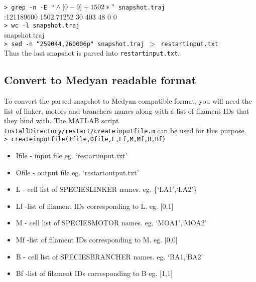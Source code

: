 \documentclass[11pt, oneside]{article}   	%
\begin{document}
\noindent \texttt{> grep -n -E $``\wedge{}[0-9]+ 1502*"$ snapshot.traj}  \\ 

:121189600 1502.71252 30 403 48 0 0 \\ 

\noindent \texttt{> wc -l snapshot.traj}  \\ 

 snapshot.traj \\ 

\noindent \texttt{> sed -n ``259044,260006p" snapshot.traj $>$ restartinput.txt} \\ 
Thus the last snapshot is parsed into \texttt{restartinput.txt}.

\subsection{Convert to Medyan readable format}
To convert the parsed snapshot to Medyan compatible format, you will need the list of linker, motors and branchers names along with a list of filament IDs that they bind with. The MATLAB script \texttt{InstallDirectory/restart/createinputfile.m} can be used for this purpose.\\

\noindent \texttt{> createinputfile(Ifile,Ofile,L,Lf,M,Mf,B,Bf)}\\ 
\begin{itemize}
\item Ifile - input file eg. `restartinput.txt'
 \item Ofile - output file eg. `restartoutput.txt'
 \item L - cell list of SPECIESLINKER names. eg. \{`LA1',`LA2'\}
\item Lf -list of filament IDs corresponding to L. eg. [0,1]
  \item M - cell list of SPECIESMOTOR names. eg. {`MOA1',`MOA2'}
  \item Mf -list of filament IDs corresponding to M. eg. [0,0]
  \item B - cell list of SPECIESBRANCHER names. eg. {`BA1,`BA2'}
 \item Bf -list of filament IDs corresponding to B eg. [1,1]
\end{itemize}
\end{document}
